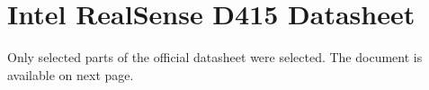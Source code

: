 \chapter{Intel\textregistered{} RealSense\texttrademark{} D415 Datasheet}
\label{ann:d415_datasheet}

Only selected parts of the official datasheet were selected. The document is available on next page.


